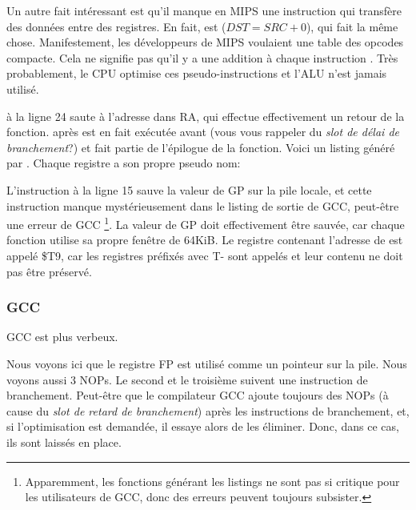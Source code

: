Un autre fait intéressant est qu'il manque en MIPS une instruction qui transfère
des données entre des registres.
En fait,   est  ($DST=SRC+0$), qui
fait la même chose.
Manifestement, les développeurs de MIPS voulaient une table des opcodes compacte.
Cela ne signifie pas qu'il y a une addition à chaque instruction .
Très probablement, le \ac{CPU} optimise ces pseudo-instructions et l'\ac{ALU} n'est
jamais utilisé.


 à la ligne 24 saute à l'adresse dans \ac{RA}, qui effectue effectivement
un retour de la fonction.
 après  est en fait exécutée avant  (vous vous rappeler
du \emph{slot de délai de branchement}?) et fait partie de l'épilogue de la fonction.
Voici un listing généré par \IDA. Chaque registre a son propre pseudo nom:



L'instruction à la ligne 15 sauve la valeur de GP sur la pile locale, et cette
instruction manque mystérieusement dans le listing de sortie de GCC, peut-être
une erreur de GCC
\footnote{Apparemment, les fonctions générant les listings ne sont pas si critique
pour les utilisateurs de GCC, donc des erreurs peuvent toujours subsister.}.
La valeur de GP doit effectivement être sauvée, car chaque fonction utilise sa
propre fenêtre de 64KiB.
Le registre contenant l'adresse de \puts est appelé \$T9, car les registres
préfixés avec T- sont appelés  et leur contenu ne doit pas être
préservé. 

\subsubsection{GCC \NonOptimizing}

GCC \NonOptimizing est plus verbeux.



Nous voyons ici que le registre FP est utilisé comme un pointeur sur la pile.
Nous voyons aussi 3 \ac{NOP}s.
Le second et le troisième suivent une instruction de branchement.
Peut-être que le compilateur GCC ajoute toujours des \ac{NOP}s (à cause du
\emph{slot de retard de branchement}) après les instructions de branchement, et,
si l'optimisation est demandée, il essaye alors de les éliminer.
Donc, dans ce cas, ils sont laissés en place.

